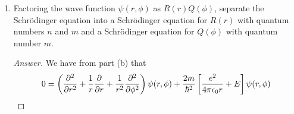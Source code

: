 \documentclass[../psets.tex]{subfiles}
\begin{document}
\begin{enumerate}
\begin{enumerate}
\begin{proof}[Answer]
\begin{align*}
            \end{align*}
            It follows by combining the last two results that
            \begin{align*}
                \begin{split}
                    \pdv[2]{\psi}{x}+\pdv[2]{\psi}{y} ={}& \left[ \cos^2\phi\pdv[2]{\psi}{r}+\frac{2\sin\phi\cos\phi}{r^2}\pdv{\psi}{\phi}-\frac{2\sin\phi\cos\phi}{r}\pdv{\psi}{r}{\phi}+\frac{\sin^2\phi}{r}\pdv{\psi}{r}+\frac{\sin^2\phi}{r^2}\pdv[2]{\psi}{\phi} \right]\\
                    & +\left[ \sin^2\phi\pdv[2]{\psi}{r}-\frac{2\sin\phi\cos\phi}{r^2}\pdv{\psi}{\phi}+\frac{2\sin\phi\cos\phi}{r}\pdv[2]{\psi}{r}{\phi}+\frac{\cos^2\phi}{r}\pdv{\psi}{r}+\frac{\cos^2\phi}{r^2}\pdv[2]{\psi}{\phi} \right]
                \end{split}\\
                ={}& (\cos^2\phi+\sin^2\phi)\pdv[2]{\psi}{r}+\frac{\sin^2\phi+\cos^2\phi}{r}\pdv{\psi}{r}+\frac{\sin^2\phi+\cos^2\phi}{r^2}\pdv[2]{\psi}{\phi}\\
                ={}& \pdv[2]{\psi}{r}+\frac{1}{r}\pdv{\psi}{r}+\frac{1}{r^2}\pdv[2]{\psi}{\phi}
            \end{align*}
            Therefore, from the above and one of our substitutions from the picture, we have that
            \begin{align*}
                \left[ -\frac{\hbar^2}{2m}\left( \pdv[2]{x}+\pdv[2]{y} \right)-\frac{e^2}{4\pi\epsilon_0\sqrt{x^2+y^2}} \right]\psi(x,y) &= E\psi(x,y)\\
                \Aboxed{\left[ -\frac{\hbar^2}{2m}\left( \pdv[2]{r}+\frac{1}{r}\pdv{r}+\frac{1}{r^2}\pdv[2]{\phi} \right)-\frac{e^2}{4\pi\epsilon_0r} \right]\psi(r,\phi) &= E\psi(r,\phi)}
            \end{align*}
        \end{proof}
        \item Factoring the wave function $\psi(r,\phi)$ as $R(r)Q(\phi)$, separate the Schr\"{o}dinger equation into a Schr\"{o}dinger equation for $R(r)$ with quantum numbers $n$ and $m$ and a Schr\"{o}dinger equation for $Q(\phi)$ with quantum number $m$.
        \begin{proof}[Answer]
            We have from part (b) that
            \begin{align*}
                0 &= \left( \pdv[2]{r}+\frac{1}{r}\pdv{r}+\frac{1}{r^2}\pdv[2]{\phi} \right)\psi(r,\phi)+\frac{2m}{\hbar^2}\left[ \frac{e^2}{4\pi\epsilon_0r}+E \right]\psi(r,\phi)\\

\end{align*}
\end{proof}
\end{enumerate}
\end{enumerate}
\end{document}
